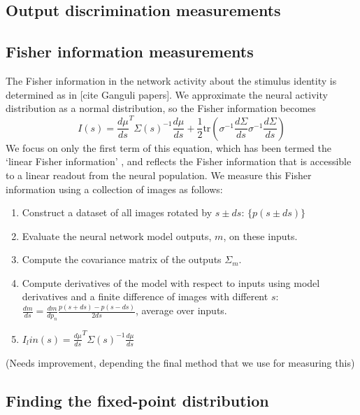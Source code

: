 \documentclass[10pt, twocolumn]{article}      %
\begin{document}
\subsection{Output discrimination measurements}

\subsection{Fisher information measurements}
The Fisher information in the network activity about the stimulus identity is determined as in [cite Ganguli papers]. We approximate the neural activity distribution as a normal distribution, so the Fisher information becomes
\begin{equation}
  I(s) = \frac{d \mu}{ds}^T \Sigma(s)^{-1} \frac{d\mu}{ds} + \frac{1}{2} \textrm{tr}( \sigma^{-1} \frac{d \Sigma}{ds}\sigma^{-1} \frac{d \Sigma}{ds})
\end{equation}
We focus on only the first term of this equation, which has been termed the `linear Fisher information' \cite{kanitscheider_measuring_2015}, and reflects the Fisher information that is accessible to a linear readout from the neural population.
We measure this Fisher information using a collection of images as follows:
\begin{enumerate}
  \item Construct a dataset of all images rotated by $s \pm ds$: $\{p(s \pm ds)\}$
  \item Evaluate the neural network model outputs, $m$, on these inputs. 
  \item Compute the covariance matrix of the outputs $\Sigma_m$.
  \item Compute derivatives of the model with respect to inputs using model derivatives and a finite difference of images with different $s$: $\frac{dm}{ds} = \frac{dm}{d p_n} \frac{p(s + ds) - p(s - ds)}{2 ds} $, average over inputs.
  \item $I_lin(s) = \frac{d \mu}{ds}^T \Sigma(s)^{-1} \frac{d\mu}{ds}$
\end{enumerate}
(Needs improvement, depending the final method that we use for measuring this)

\subsection{Finding the fixed-point distribution}




\end{document}
